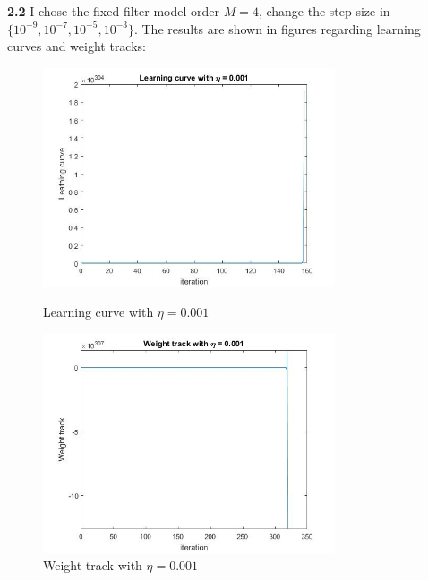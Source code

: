 \documentclass[a4paper]{article}
\begin{document}
\begin{spacing}{2.0}
\textbf{2.2}  
	I chose the fixed filter model order $M = 4$, change the step size in $\{10^{-9}, 10^{-7}, 10^{-5}, 10^{-3}\}$. The results are shown in figures regarding learning curves and weight tracks:\\
	\begin{figure}[H]
	    \begin{minipage}[t]{0.5\textwidth}
	        \centering
	        \includegraphics[width=3.4in]{LC_3.jpg}
	        \caption{Learning curve with $\eta = 0.001$}
	        \label{fig:side:a}
	    \end{minipage}%
	  \begin{minipage}[t]{0.5\textwidth}
	      \centering
	      \includegraphics[width=3.4in]{WT_3.jpg}
	      \caption{Weight track with $\eta = 0.001$}
	      \label{fig:side:b}
	    \end{minipage}
	\end{figure}
	

\end{spacing}
\end{document}
